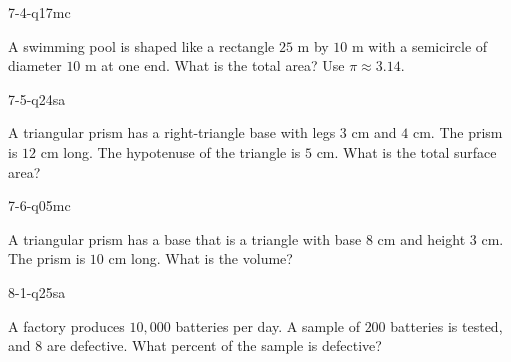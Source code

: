 \begin{practiceQuestion}{7-4-q17}{mc}
\begin{questionText}
A swimming pool is shaped like a rectangle $25$ m by $10$ m with a semicircle of diameter $10$ m at one end. What is the total area? Use $\pi \approx 3.14$.
\end{questionText}
\end{practiceQuestion}

\begin{practiceQuestion}{7-5-q24}{sa}
\begin{questionText}
A triangular prism has a right-triangle base with legs $3$ cm and $4$ cm. The prism is $12$ cm long. The hypotenuse of the triangle is $5$ cm. What is the total surface area?
\end{questionText}
\end{practiceQuestion}

\begin{practiceQuestion}{7-6-q05}{mc}
\begin{questionText}
A triangular prism has a base that is a triangle with base $8$ cm and height $3$ cm. The prism is $10$ cm long. What is the volume?
\end{questionText}
\end{practiceQuestion}

\begin{practiceQuestion}{8-1-q25}{sa}
\begin{questionText}
A factory produces $10{,}000$ batteries per day. A sample of $200$ batteries is tested, and $8$ are defective. What percent of the sample is defective?
\end{questionText}
\end{practiceQuestion}

